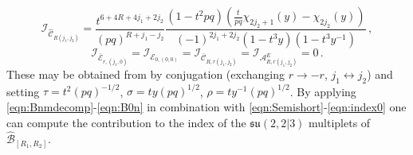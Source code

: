 \documentclass[main.tex]{subfiles}
\begin{document}
\begin{equation}
\mathcal{I}_{\hat{\mathcal{C}}_{R(j_1,j_2)}}=\frac{t^{6+4R+4j_1+2j_2}}{(pq)^{R+j_1-j_2}}\frac{\left(1-t^2pq\right)\left(\frac{t}{pq}\chi_{2j_2+1}(y)-\chi_{2j_2}(y)\right)}{(-1)^{2j_1+2j_2}(1-t^3y)(1-t^3y^{-1})}\,,
\end{equation}
\begin{equation}
\mathcal{I}_{\overline{\mathcal{E}}_{r,(j_1,0)}}=\mathcal{I}_{\mathcal{E}_{0,(0,0)}}=\mathcal{I}_{\overline{\mathcal{C}}_{R,r(j_1,j_2)}}=\mathcal{I}_{\mathcal{A}^{E}_{R,r(j_1,j_2)}}=0\label{eqn:index0}\,.
\end{equation}
These may be obtained from \cite{Gadde:2011uv} by conjugation (exchanging $r\to-r$, $j_1\leftrightarrow j_2$) and setting $\tau=t^2(pq)^{-1/2}$, $\sigma=ty(pq)^{1/2}$, $\rho=ty^{-1}(pq)^{1/2}$.
By applying \eqref{eqn:Bnmdecomp}-\eqref{eqn:B0n} in combination with \eqref{eqn:Semishort}-\eqref{eqn:index0} one can compute the contribution to the index of the $\mathfrak{su}(2,2|3)$ multiplets of $\hat{\mathcal{B}}_{[R_1,R_2]}$.
\end{document}
